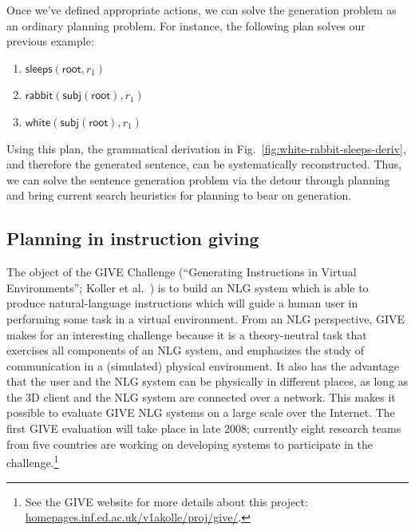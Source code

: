 Once we've defined appropriate actions, we can solve the generation
problem as an ordinary planning problem. For instance, the following plan
solves our previous example:
%
\begin{enumerate}
\item $\mathsf{sleeps}(\mathsf{root}, r_1)$
\item $\mathsf{rabbit}(\mathsf{subj}(\mathsf{root}), r_1)$
\item $\mathsf{white}(\mathsf{subj}(\mathsf{root}), r_1)$
\end{enumerate}
%
Using this plan, the grammatical derivation in
Fig.~\ref{fig:white-rabbit-sleeps-deriv}, and therefore the generated
sentence, can be systematically reconstructed. Thus, we can solve the
sentence generation problem via the detour through planning and bring
current search heuristics for planning to bear on generation.



\subsection{Planning in instruction giving}

The object of the GIVE Challenge (``Generating Instructions in Virtual
Environments''; Koller et al.\ \citeyear{alexander07:_shared_task_propos})
is to build an NLG system which is able to produce natural-language
instructions which will guide a human user in performing some task in a
virtual environment. From an NLG perspective, GIVE makes for an
interesting challenge because it is a theory-neutral task that exercises
all components of an NLG system, and emphasizes the study of communication
in a (simulated) physical environment. It also has the advantage that the
user and the NLG system can be physically in different places, as long as
the 3D client and the NLG system are connected over a network. This makes
it possible to evaluate GIVE NLG systems on a large scale over the
Internet. The first GIVE evaluation will take place in late 2008;
currently eight research teams from five countries are working on
developing systems to participate in the challenge.\footnote{See the GIVE
 website for more details about this project:
 \url{homepages.inf.ed.ac.uk/v1akolle/proj/give/}.}

